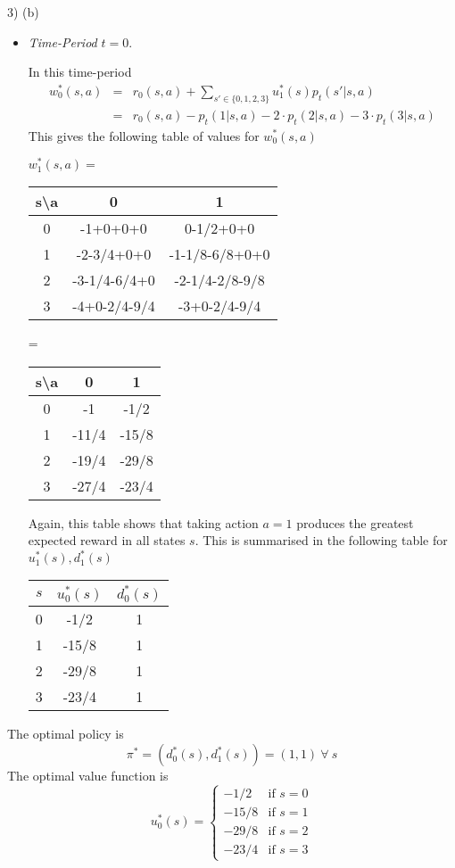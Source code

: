 \documentclass[11pt,a4paper]{article}
\begin{document}
\begin{answer}{3) (b)}
\begin{itemize}
    \item \textit{Time-Period} $t=0$.
    \par In this time-period
    \[\begin{array}{rcl}
      w_0^*(s,a)&=&r_0(s,a)+\sum_{s'\in\{0,1,2,3\}}u_1^*(s)p_t(s'|s,a)\\
      &=&r_0(s,a)-p_t(1|s,a)-2\cdot p_t(2|s,a)-3\cdot p_t(3|s,a)
    \end{array}\]
    This gives the following table of values for $w_0^*(s,a)$
    \begin{center}
      $w_1^*(s,a)=$
      \begin{tabular}{c|cc}
        s\textbackslash a&0&1\\\hline
        0&-1+0+0+0&0-1/2+0+0\\
        1&-2-3/4+0+0&-1-1/8-6/8+0+0\\
        2&-3-1/4-6/4+0&-2-1/4-2/8-9/8\\
        3&-4+0-2/4-9/4&-3+0-2/4-9/4
      \end{tabular}
      =
      \begin{tabular}{c|cc}
        s\textbackslash a&0&1\\\hline
        0&-1&-1/2\\
        1&-11/4&-15/8\\
        2&-19/4&-29/8\\
        3&-27/4&-23/4
      \end{tabular}
    \end{center}
    Again, this table shows that taking action $a=1$ produces the greatest expected reward in all states $s$. This is summarised in the following table for $u_1^*(s),d_1^*(s)$
    \begin{center}
      \begin{tabular}{c|c|c}
        $s$&$u_0^*(s)$&$d_0^*(s)$\\\hline
        0&-1/2&1\\
        1&-15/8&1\\
        2&-29/8&1\\
        3&-23/4&1
      \end{tabular}
    \end{center}
  \end{itemize}
  The optimal policy is
  \[ \pi^*=(d_0^*(s),d_1^*(s))=(1,1)\ \forall\ s \]
  The optimal value function is
  \[ u_0^*(s)=\begin{cases}
                -1/2&\text{if }s=0\\
                -15/8&\text{if }s=1\\
                -29/8&\text{if }s=2\\
                -23/4&\text{if }s=3
              \end{cases} \]
\end{answer}
\end{document}
